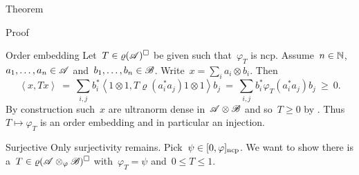 \documentclass[b]{subfiles}
\begin{document}
\begin{parsec}
\begin{point}{Theorem}
\begin{point}{Proof}
\begin{point}{Order embedding}
Let~$T \in \varrho(\mathscr{A})^\square$
    be given such that~$\varphi_T$ is ncp.
Assume~$n \in \mathbb{N}$, $a_1, \ldots, a_n \in \mathscr{A}$
and~$b_1, \ldots, b_n \in \mathscr{B}$.
Write~$x = \sum_{i} a_i \otimes b_i$.
Then
\begin{equation*}
    \left<x, T x \right>
    \ =\  \sum_{i,j} b_i^* \left< 1\otimes 1, T \varrho(a_i^*a_j) 1 \otimes 1\right> b_j
    \ = \ \sum_{i,j} b_i^* \varphi_T (a_i^*a_j) b_j \ \geq\  0.
\end{equation*}
By construction such~$x$ are ultranorm dense in~$\mathscr{A}\otimes\mathscr{B}$
    and so~$T \geq 0$ by .
Thus~$T \mapsto \varphi_T$ is an order embedding
    and in particular an injection.
\end{point}
\begin{point}{Surjective}%
Only surjectivity remains.
Pick~$\psi \in [0,\varphi]_{\mathrm{ncp}}$.
We want to show there is a~$T \in \varrho(\mathscr{A} \otimes_\varphi \mathscr{B})^\square$
    with~$\varphi_T = \psi$ and~$0 \leq T \leq 1$.


\end{point}
\end{point}
\end{point}
\end{parsec}
\end{document}
